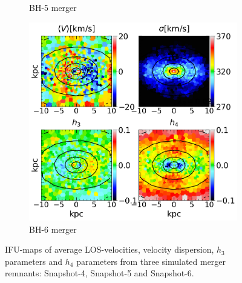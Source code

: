 \documentclass[english, oneside]{HYgradu}
\begin{document}
\begin{figure}
\begin{subfigure}[b]{0.49\textwidth}
		\caption{BH-5 merger}
	\end{subfigure}
	\begin{subfigure}[b]{0.49\textwidth}
		\includegraphics[width=\textwidth]{BH_6.png}
		\caption{BH-6 merger}
	\end{subfigure}
	\caption{IFU-maps of average LOS-velocities, velocity dispersion, $h_3$ parameters and $h_4$ parameters from three simulated merger remnants: Snapshot-4, Snapshot-5 and Snapshot-6.}
	\label{figure:all_voronoi_2}
\end{figure}



\newcommand{\apj}{The Astrophysical Journal}
\newcommand{\mnras}{Monthly Notices of the Royal Astronomical Society}
\newcommand{\apjs}{The Astrophysical Journal Supplement}
\newcommand{\nat}{Nature}
\newcommand{\aj}{The Astronomical Journal}
\newcommand{\na}{New Astronomy}
\newcommand{\araa}{Annual Review of Astronomy and Astrophysics}
\newcommand{\aap}{Astronomy and Astrophysics}

\clearpage
{} %


\end{document}
